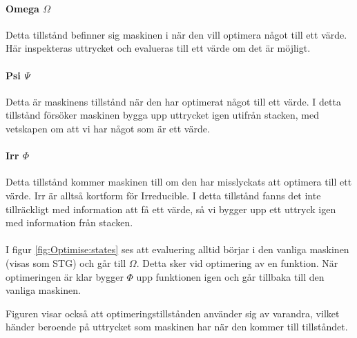 \documentclass[Rapport]{subfiles}
\begin{document}
\paragraph{Omega $\Omega$} Detta tillstånd befinner sig maskinen i när den vill optimera något till ett värde. Här
inspekteras uttrycket och evalueras till ett värde om det är möjligt.

\paragraph{Psi $\Psi$} Detta är maskinens tillstånd när den har optimerat något till ett värde. I detta tillstånd
försöker maskinen bygga upp uttrycket igen utifrån stacken, med vetskapen om att vi har
något som är ett värde.

\paragraph{Irr $\Phi$} Detta tillstånd kommer maskinen till om den har misslyckats att optimera till ett värde. Irr är alltså kortform för Irreducible.
I detta tillstånd fanns det inte tillräckligt med information att få ett
värde, så vi bygger upp ett uttryck igen med information från stacken.

\paragraph{}
I figur \ref{fig:Optimise:states} ses att evaluering alltid börjar i den vanliga maskinen
 (visas som STG) och går till $\Omega$. Detta sker vid optimering av en funktion.
När optimeringen är klar bygger $\Phi$ upp funktionen igen och går tillbaka till den vanliga maskinen.

\stgOptimise

Figuren visar också att optimeringstillstånden använder sig av varandra, vilket
händer beroende på uttrycket som maskinen har när den kommer till tillståndet.














\end{document}
